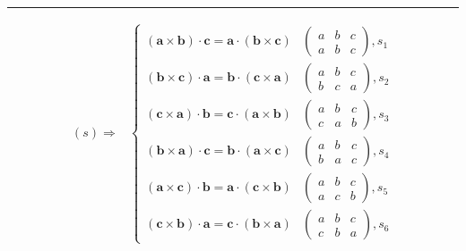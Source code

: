 \documentclass[
]{book}
\theoremstyle{definition}
\theoremstyle{definition}
\theoremstyle{definition}
\theoremstyle{definition}
\theoremstyle{remark}
\begin{document}
\begin{center}\rule{0.5\linewidth}{0.5pt}\end{center}

\[
\begin{aligned}
\left(s\right)\Rightarrow & \begin{cases}
\left(\boldsymbol{a}\times\boldsymbol{b}\right)\cdot\boldsymbol{c}=\boldsymbol{a}\cdot\left(\boldsymbol{b}\times\boldsymbol{c}\right) & \begin{pmatrix}a & b & c\\
a & b & c
\end{pmatrix},s_{{\scriptscriptstyle 1}}\\
\left(\boldsymbol{b}\times\boldsymbol{c}\right)\cdot\boldsymbol{a}=\boldsymbol{b}\cdot\left(\boldsymbol{c}\times\boldsymbol{a}\right) & \begin{pmatrix}a & b & c\\
b & c & a
\end{pmatrix},s_{{\scriptscriptstyle 2}}\\
\left(\boldsymbol{c}\times\boldsymbol{a}\right)\cdot\boldsymbol{b}=\boldsymbol{c}\cdot\left(\boldsymbol{a}\times\boldsymbol{b}\right) & \begin{pmatrix}a & b & c\\
c & a & b
\end{pmatrix},s_{{\scriptscriptstyle 3}}\\
\left(\boldsymbol{b}\times\boldsymbol{a}\right)\cdot\boldsymbol{c}=\boldsymbol{b}\cdot\left(\boldsymbol{a}\times\boldsymbol{c}\right) & \begin{pmatrix}a & b & c\\
b & a & c
\end{pmatrix},s_{{\scriptscriptstyle 4}}\\
\left(\boldsymbol{a}\times\boldsymbol{c}\right)\cdot\boldsymbol{b}=\boldsymbol{a}\cdot\left(\boldsymbol{c}\times\boldsymbol{b}\right) & \begin{pmatrix}a & b & c\\
a & c & b
\end{pmatrix},s_{{\scriptscriptstyle 5}}\\
\left(\boldsymbol{c}\times\boldsymbol{b}\right)\cdot\boldsymbol{a}=\boldsymbol{c}\cdot\left(\boldsymbol{b}\times\boldsymbol{a}\right) & \begin{pmatrix}a & b & c\\
c & b & a
\end{pmatrix},s_{{\scriptscriptstyle 6}}
\end{cases}\\

\end{aligned}\]
\end{document}
